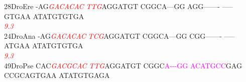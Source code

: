 \documentclass[11pt,twoside,reqno,a4paper]{article}
\begin{document}
{28\hspace*{2\charwidth}DroEre	-AG\textit{\textcolor{red}{G}}\textit{\textcolor{red}{A}}\textit{\textcolor{red}{C}}\textit{\textcolor{red}{A}}\textit{\textcolor{red}{C}}\textit{\textcolor{red}{A}}\textit{\textcolor{red}{C}}	\textit{\textcolor{red}{T}}\textit{\textcolor{red}{T}}\textit{\textcolor{red}{G}}AGGATGT	CGGCA---GG	AGG-------	-----GTGAA	ATATGTGTGA	\\
\hspace*{4\charwidth}\hspace*{7\charwidth}\hspace*{3\charwidth}\textit{\textcolor{red}{9.3}}\hspace*{1\charwidth}\hspace*{1\charwidth}\hspace*{1\charwidth}\hspace*{1\charwidth}\hspace*{1\charwidth}\hspace*{1\charwidth}\\
24\hspace*{2\charwidth}DroAna	-AG\textit{\textcolor{red}{G}}\textit{\textcolor{red}{A}}\textit{\textcolor{red}{C}}\textit{\textcolor{red}{A}}\textit{\textcolor{red}{C}}\textit{\textcolor{red}{A}}\textit{\textcolor{red}{C}}	\textit{\textcolor{red}{T}}\textit{\textcolor{red}{C}}\textit{\textcolor{red}{G}}AGGATGT	CGGCA---GG	CGG-------	-----ATGAA	ATATGTGTGA	\\
\hspace*{4\charwidth}\hspace*{7\charwidth}\hspace*{3\charwidth}\textit{\textcolor{red}{9.3}}\hspace*{1\charwidth}\hspace*{1\charwidth}\hspace*{1\charwidth}\hspace*{1\charwidth}\hspace*{1\charwidth}\hspace*{1\charwidth}\\
49\hspace*{2\charwidth}DroPse	CAC\textit{\textcolor{red}{G}}\textit{\textcolor{red}{A}}\textit{\textcolor{red}{C}}\textit{\textcolor{red}{G}}\textit{\textcolor{red}{C}}\textit{\textcolor{red}{A}}\textit{\textcolor{red}{C}}	\textit{\textcolor{red}{T}}\textit{\textcolor{red}{T}}\textit{\textcolor{red}{G}}AGGATGT	CGGC\textcolor{magenta}{A}\textcolor{magenta}{-}\textcolor{magenta}{-}\textcolor{magenta}{-}\textcolor{magenta}{G}\textcolor{magenta}{G}	\textcolor{magenta}{A}\textcolor{magenta}{C}\textcolor{magenta}{A}\textcolor{magenta}{T}\textcolor{magenta}{G}\textcolor{magenta}{C}\textcolor{magenta}{C}GAG	CCGCAGTGAA	ATATGTGAGA	\\
}
\end{document}
